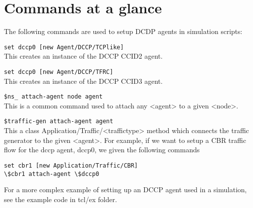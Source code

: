 \section{Commands at a glance}
\label{sec:dccpcommand}

The following commands are used to setup DCDP agents in simulation scripts:
\begin{flushleft}
{\tt set dccp0 [new Agent/DCCP/TCPlike]}\\
This creates an instance of the DCCP CCID2 agent.

{\tt set dccp0 [new Agent/DCCP/TFRC]}\\
This creates an instance of the DCCP CCID3 agent.

{\tt \$ns\_ attach-agent \<node\> \<agent\>}\\
This is a common command used to attach any <agent> to a given <node>.

{\tt \$traffic-gen attach-agent \<agent\>}\\
This a class Application/Traffic/<traffictype> method which connects the
traffic generator to the given <agent>. For example, if we want to setup
a CBR traffic flow for the dccp agent, dccp0, we given the following commands\\
\begin{verbatim}
set cbr1 [new Application/Traffic/CBR]
\$cbr1 attach-agent \$dccp0
\end{verbatim}

For a more complex example of setting up an DCCP agent used in a simulation, see
the example code in tcl/ex folder.

\end{flushleft}

\endinput